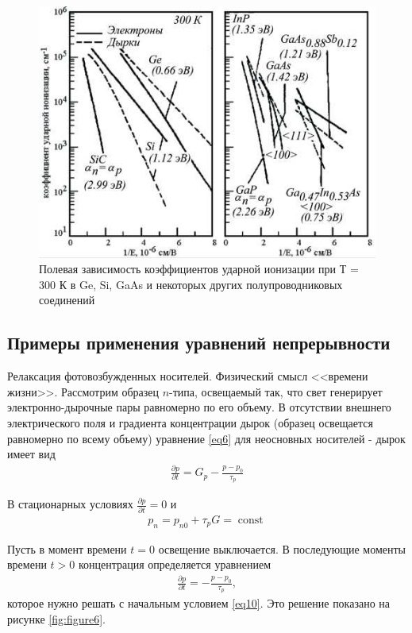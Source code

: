 \documentclass[a4paper,12pt]{article}
\DeclareMathOperator{\const}{const}
\begin{document}
\begin{figure}[H]
	\centering
	\includegraphics[]{6}
	\caption{Полевая зависимость коэффициентов ударной ионизации при Т = 300 К в Ge, Si, GaAs и некоторых других полупроводниковых соединений}
	\label{fig:figure5}
\end{figure}



\subsection{Примеры применения уравнений непрерывности}

Релаксация фотовозбужденных носителей. Физический смысл <<времени жизни>>. Рассмотрим образец $n$-типа, освещаемый так, что свет генерирует электронно-дырочные пары равномерно по его объему. В отсутствии внешнего электрического поля и градиента концентрации дырок (образец освещается равномерно по всему объему) уравнение \eqref{eq6} для неосновных носителей - дырок имеет вид
\begin{gather}
	\label{eq9}
	\frac{\partial p}{\partial t}=G_{p}-\frac{p-p_{0}}{\tau_{p}}
\end{gather}

В стационарных условиях $\frac{\partial p}{\partial t}=0$ и
\begin{gather}
	\label{eq10}
	p_{n}=p_{n 0}+\tau_{p} G=\const
\end{gather}

Пусть в момент времени $t = 0$ освещение выключается. В последующие моменты времени $t > 0$ концентрация определяется уравнением
\begin{gather}
	\label{eq11}
	\frac{\partial p}{\partial t}=-\frac{p-p_{0}}{\tau_{p}},
\end{gather}
которое нужно решать с начальным условием \eqref{eq10}. Это решение показано на рисунке \ref{fig:figure6}.
\end{document}
